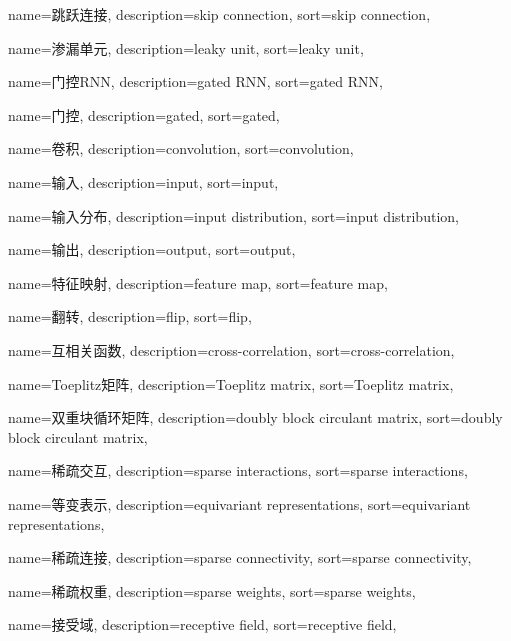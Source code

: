 {
  name=跳跃连接,
  description={skip connection},
  sort={skip connection},
}

{
  name=渗漏单元,
  description={leaky unit},
  sort={leaky unit},
}

{
  name=门控RNN,
  description={gated RNN},
  sort={gated RNN},
}

{
  name=门控,
  description={gated},
  sort={gated},
}

{
  name=卷积,
  description={convolution},
  sort={convolution},
}

{
  name=输入,
  description={input},
  sort={input},
}

{
  name=输入分布,
  description={input distribution},
  sort={input distribution},
}

{
  name=输出,
  description={output},
  sort={output},
}

{
  name=特征映射,
  description={feature map},
  sort={feature map},
}

{
  name=翻转,
  description={flip},
  sort={flip},
}

{
  name=互相关函数,
  description={cross-correlation},
  sort={cross-correlation},
}

{
  name=Toeplitz矩阵,
  description={Toeplitz matrix},
  sort={Toeplitz matrix},
}

{
  name=双重块循环矩阵,
  description={doubly block circulant matrix},
  sort={doubly block circulant matrix},
}

{
  name=稀疏交互,
  description={sparse interactions},
  sort={sparse interactions},
}

{
  name=等变表示,
  description={equivariant representations},
  sort={equivariant representations},
}

{
  name=稀疏连接,
  description={sparse connectivity},
  sort={sparse connectivity},
}

{
  name=稀疏权重,
  description={sparse weights},
  sort={sparse weights},
}

{
  name=接受域,
  description={receptive field},
  sort={receptive field},
}

